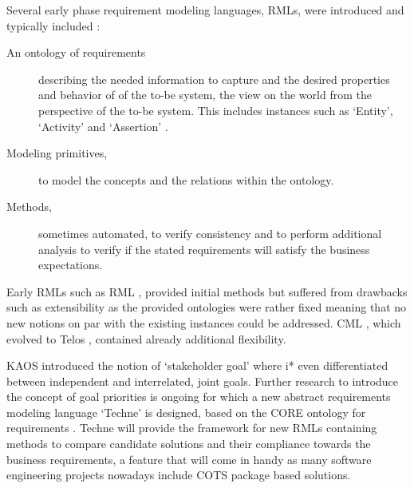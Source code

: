 Several early phase requirement modeling languages, RMLs, were introduced and typically included : 
\begin{description}
	\item[An ontology of requirements] describing the needed information to capture and the desired properties and behavior of of the to-be system, the view on the world from the perspective of the to-be system. This includes instances such as `Entity', `Activity' and `Assertion' .
	\item[Modeling primitives,] to model the concepts and the relations within the ontology.
	\item[Methods,] sometimes automated, to verify consistency and to perform additional analysis to verify if the stated requirements will satisfy the business expectations.
\end{description}

\noindent
{}%
%
%
%
%
Early RMLs such as RML , provided initial methods but suffered from drawbacks such as extensibility as the provided ontologies were rather fixed meaning that no new notions on par with the existing instances could be addressed. CML , which evolved to Telos , contained already additional flexibility. 

KAOS  introduced the notion of `stakeholder goal' where i*  even differentiated between independent and interrelated, joint goals.
Further research to introduce the concept of goal priorities is ongoing for which a new abstract requirements modeling language `Techne'  is designed, based on the CORE ontology for requirements . Techne will provide the framework for new RMLs containing methods to compare candidate solutions and their compliance towards the business requirements, a feature that will come in handy as many software engineering projects nowadays include COTS package based solutions.

